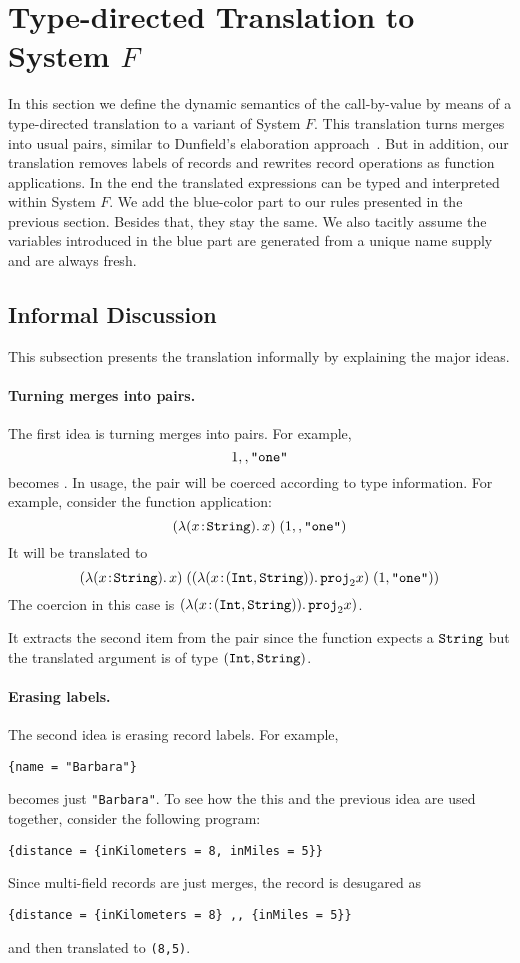 \section{Type-directed Translation to System $ F $}

In this section we define the dynamic semantics of the call-by-value \name by
means of a type-directed translation to a variant of System $F$. This
translation turns merges into usual pairs, similar to Dunfield's elaboration
approach~\cite{dunfield2014elaborating}. But in addition, our translation
removes labels of records and rewrites record operations as function
applications. In the end the translated expressions can be typed and interpreted
within System $F$. We add the blue-color part to our rules presented in the
previous section. Besides that, they stay the same. We also tacitly assume the
variables introduced in the blue part are generated from a unique name supply and
are always fresh.

\subsection{Informal Discussion}

This subsection presents the translation informally by explaining the major
ideas.

\paragraph{Turning merges into pairs.}
The first idea is turning merges into pairs. For example,
\[
1 ,, \texttt{"one"}
\]
becomes  {}.
In usage, the pair will be coerced according to type information. For example,
consider the function application:
\[
(\lambda (x \!:\! \texttt{String}).\, x) \; (1 ,, \texttt{"one"})
\]
It will be translated to
\[
(\lambda (x \!:\! \texttt{String}).\, x) \; ((\lambda (x \!:\! (\texttt{Int}, \texttt{String})).\, {\texttt{proj}}_{2} x) \; (1, \texttt{"one"}))
\]
The coercion in this case is $(\lambda (x \!:\! (\texttt{Int}, \texttt{String})).\, {\texttt{proj}}_{2} x)$.

\noindent It extracts the second item from the pair since the function expects a $\texttt{String}$
but the translated argument is of type $(\texttt{Int}, \texttt{String})$.

\paragraph{Erasing labels.}
The second idea is erasing record labels. For example,
\begin{lstlisting}
{name = "Barbara"}
\end{lstlisting}
becomes just \lstinline{"Barbara"}.
To see how the this and the previous idea are used together, consider the following program:
\begin{lstlisting}
{distance = {inKilometers = 8, inMiles = 5}}
\end{lstlisting}
Since multi-field records are just merges, the record is desugared as
\begin{lstlisting}
{distance = {inKilometers = 8} ,, {inMiles = 5}}
\end{lstlisting}
and then translated to \lstinline{(8,5)}.

